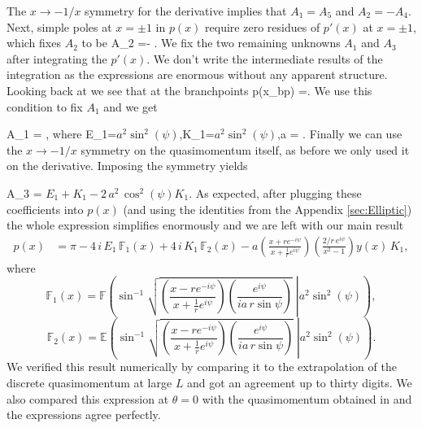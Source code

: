  The $x\rightarrow-1/x$ symmetry for the derivative implies that $A_1 = A_5$ and $A_2 = -A_4$. Next, simple poles at $x=\pm 1$ in $p(x)$ require zero residues of $p'(x)$ at $x=\pm1$, which fixes $A_2$ to be
\beq
	A_2 =- .
\eeq
We fix the two remaining unknowns $A_1$ and $A_3$ after integrating the $p'(x)$. We don't write the intermediate results of the integration as the expressions are enormous without any apparent structure.
Looking back at  we see that at the branchpoints
\beq
	p(x_{bp}) =\pm \pi.
\eeq
We use this condition to fix $A_1$ and we get

\beq
	A_1 = ,
\eeq
where
\beq
E_1=\(a^2\sin^2(\psi)\),\;K_1=\(a^2\sin^2(\psi)\),\;a = .
\label{eq:E1K1}
\eeq
Finally we can use the $x \rightarrow -1/x$ symmetry on the quasimomentum itself, as before we only used it on the derivative. Imposing the symmetry yields

\beq
	A_3 = \(E_1+K_1-2\,a^2\,\cos^2(\psi)K_1\).
\eeq
As expected, after plugging  these coefficients into $p(x)$ (and using the identities from the Appendix \ref{sec:Elliptic}) the whole expression simplifies enormously and we are left with our main result
\begin{align}
	\label{eq:pmainresult}
	p(x) &= \pi - 4\,i\,  E_1\, \mathbb{F}_1(x) + 4\,i\,  K_1\, \mathbb{F}_2(x) - a \left( \frac{x+ r e^{-i\psi}}{x+\frac{1}{r} e^{i\psi}} \right) \left(\frac{2/r\,e^{i \psi}}{x^2 - 1} \right) y(x)\,K_1,
\end{align}
where
\begin{equation}
	\mathbb{F}_1(x) = \mathbb{F}\left( \left. \sin^{-1} \sqrt{ \left( \frac{x -r e^{-i\psi}}{x+ \frac{1}{r} e^{i\psi}} \right) \left( \frac{ e^{ i \psi}}{ia\,r\sin\psi} \right)} \; \right| a^2 \sin^2(\psi) \right),
\end{equation}
\begin{equation}
	\mathbb{F}_2(x) = \mathbb{E}\left( \left. \sin^{-1} \sqrt{ \left( \frac{x -r e^{-i\psi}}{x+ \frac{1}{r} e^{i\psi}} \right) \left( \frac{ e^{ i \psi}}{ia\,r\sin\psi} \right) } \; \right| a^2 \sin^2(\psi) \right).
\end{equation}
We verified this result numerically by comparing it to the extrapolation of the discrete quasimomentum  at large $L$ and got an agreement up to thirty digits. We also compared this expression at $\theta = 0$ with the quasimomentum obtained in \cite{Gromov:2012eu} and the expressions agree perfectly.

